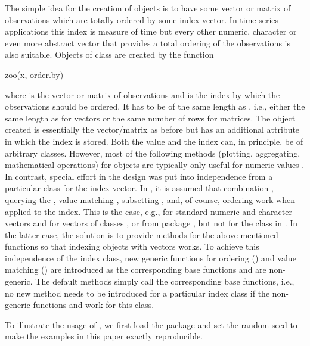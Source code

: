 \documentclass{Z}
\begin{document}
The simple idea for the creation of  objects is to have
some vector or matrix of observations  which are totally ordered
by some index vector. In time series applications this index is measure of
time but every other numeric, character or even more abstract vector that
provides a total ordering of the observations is also suitable. Objects
of class  are created by the function
\begin{Scode}
zoo(x, order.by)
\end{Scode}
where  is the vector or matrix of observations and 
is the index by which the observations should be ordered. It has to be
of the same length as , i.e., either the same length as 
for vectors or the same number of rows for matrices. The  object
created is essentially the vector/matrix as before but has an additional
 attribute in which the index is stored. Both the value 
and the index can, in principle, be of arbitrary classes. However, most of the
following methods (plotting, aggregating, mathematical operations) for 
objects are typically only useful for numeric values . In contrast, special
effort in the design was put into independence from a particular class for
the index vector. In , it is assumed that combination ,
querying the , value matching , subsetting \code{[,},
and, of course, ordering  work when applied to the index. 
This is the case, e.g., for standard numeric and character vectors and for
vectors of classes ,  or 
from package , but not for the class  in .
In the latter case, the solution is to provide methods for the above mentioned
functions so that indexing  objects with  vectors works.
To achieve this  independence of the index class, new generic functions for
ordering () and value matching () are introduced
as the corresponding base functions  and  are 
non-generic. The default methods simply call the corresponding base functions, i.e.,
no new method needs to be introduced for a particular index class if the 
non-generic functions  and  work for this class.

To illustrate the usage of , we first load the package and set the
random seed to make the examples in this paper exactly reproducible.
\end{document}

